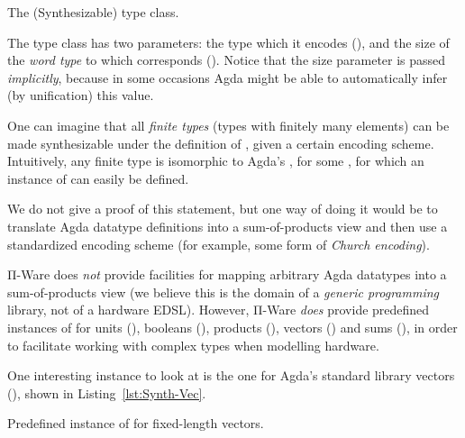             \begin{listing}[h]
                \newline
                \caption{The  (Synthesizable) type class.\label{lst:Synth}}
            \end{listing}


            The type class has two parameters: the type which it encodes (),
            and the size of the \emph{word type} to which  corresponds ().
            Notice that the size parameter is passed \emph{implicitly}, because in some occasions
            Agda might be able to automatically infer (by unification) this value.

            One can imagine that all \emph{finite types} (types with finitely many elements)
            can be made synthesizable under the definition of , given a certain encoding scheme.
            Intuitively, any finite type is isomorphic to Agda's  , for some ,
            for which an instance of  can easily be defined.

            We do not give a proof of this statement, but one way of doing it would be to translate
            Agda datatype definitions into a sum-of-products view and then use a standardized
            encoding scheme (for example, some form of \emph{Church encoding}).

            Π-Ware does \emph{not} provide facilities for mapping arbitrary Agda datatypes into
            a sum-of-products view (we believe this is the domain of a \emph{generic programming} library,
            not of a hardware \ac{EDSL}).
            However, Π-Ware \emph{does} provide predefined instances of  for units (),
            booleans (), products (), vectors () and sums (),
            in order to facilitate working with complex types when modelling hardware.

            One interesting instance to look at is the one for Agda's standard library vectors (),
            shown in Listing~\ref{lst:Synth-Vec}.

            \begin{listing}[h]
                \caption{Predefined instance of  for fixed-length vectors.\label{lst:Synth-Vec}}
            \end{listing}

